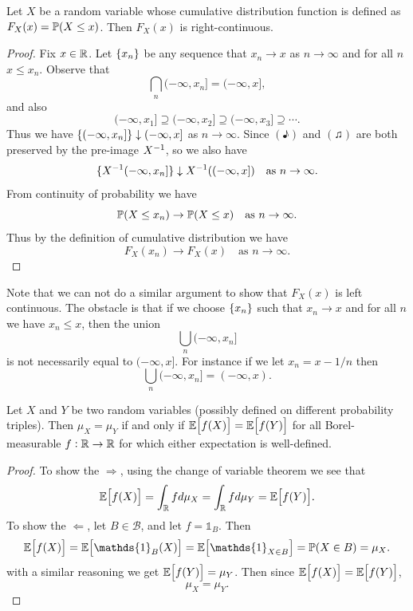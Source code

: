 \begin{proposition}
	Let $ X $ be a random variable whose cumulative distribution function is defined as $ F_X(x) = \mathbb{P}(X \leq x) $. Then $ F_X(x) $ is right-continuous.
\end{proposition}
\begin{proof}
	Fix $ x \in \mathbb{R} $. Let $ \{x_n\} $ be any sequence that $ x_n \to x $ as $ n \to\infty $ and for all $ n $ $ x \leq x_n $. Observe that 
	\[ \bigcap_n (-\infty,x_n] = (-\infty,x], \tag{\eighthnote}\]
	and also 
	\[ (-\infty,x_1] \supseteq (-\infty,x_2] \supseteq (-\infty,x_3] \supseteq \cdots. \tag{\twonotes}\]
	Thus we have $ \{(-\infty,x_n]\}\downarrow (-\infty,x] $ as $ n\to\infty $. Since $ (\eighthnote) $ and $ (\twonotes) $ are both preserved by the pre-image $ X^{-1} $, so we also have
	\[ \{X^{-1}(-\infty,x_n]\}\downarrow X^{-1}((-\infty,x]) \quad \text{as $ n\to\infty $}.\]
	From continuity of probability we have
	\[ \mathbb{P}(X\leq x_n) \to \mathbb{P}(X\leq x) \quad \text{as } n \to \infty. \]
	Thus by the definition of cumulative distribution we have
	\[ F_X(x_n) \to F_X(x) \quad \text{as }n\to\infty. \]
\end{proof}
\begin{remark}
	Note that we can not do a similar argument to show that $ F_X(x) $ is left continuous. The obstacle is that if we choose $ \{x_n\} $ such that $ x_n\to x $ and for all $ n $ we have $ x_n \leq x $, then the union
	\[ \bigcup_n(-\infty,x_n] \]
	is not necessarily equal to $ (-\infty,x] $. For instance if we let $ x_n = x - 1/n $ then 
	\[ \bigcup_n(-\infty,x_n] = (-\infty,x). \]
\end{remark}

\begin{proposition}
	Let $ X $ and $ Y $ be two random variables (possibly defined on different probability triples). Then $ \mu_X = \mu_Y $ if and only if $ \mathbb{E}\big[f(X)\big] = \mathbb{E}\big[f(Y)\big] $ for all Borel-measurable $ f:\mathbb{R} \to \mathbb{R} $ for which either expectation is well-defined.
\end{proposition}
\begin{proof}
	To show the $ \boxed{\Longrightarrow} $, using the change of variable theorem we see that
	\[ \mathbb{E}\big[f(X)\big] = \int_{\mathbb{R}} f d\mu_X = \int_{\mathbb{R}} f d\mu_Y =  \mathbb{E}\big[f(Y)\big]. \]
	To show the $ \boxed{\Longleftarrow} $, let $ B \in \mathcal{B} $, and let $ f = \mathds{1}_B $. Then 
	\[ \E{f(X)} = \E{\mathds{1}_{B}(X)} = \E{\mathds{1}_{X\in B}} = \prob(X\in B) = \mu_X.  \]
	with a similar reasoning we get $ \mathbb{E}\big[f(Y)\big] = \mu_Y $. Then since $ \mathbb{E}\big[f(X)\big] = \mathbb{E}\big[f(Y)\big] $,
	\[ \mu_X = \mu_Y. \]
\end{proof}



